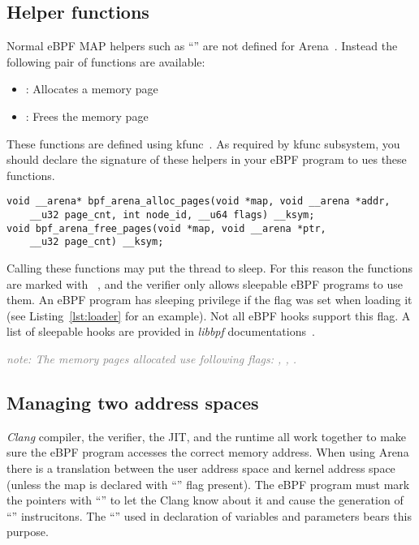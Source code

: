 \documentclass{article}
\begin{document}
\subsection{Helper functions}
Normal eBPF MAP helpers such as ``'' are not
defined for Arena~\cite{arena_source}. Instead the following pair of functions
are available:
\begin{itemize}
    \item {}: Allocates a memory page
    \item {}: Frees the memory page
\end{itemize}

These functions are defined using kfunc~\cite{eunomia_kfunc, ebpf_docs_kfunc}.
As required by kfunc subsystem, you should declare the signature of these
helpers in your eBPF program to ues these functions.
\begin{minipage}{\linewidth}
\begin{flushleft}
\begin{lstlisting}[caption={Functions operating on Arena MAP.}, label={lst:arena_kfuncs}]
void __arena* bpf_arena_alloc_pages(void *map, void __arena *addr,
    __u32 page_cnt, int node_id, __u64 flags) __ksym;
void bpf_arena_free_pages(void *map, void __arena *ptr,
    __u32 page_cnt) __ksym;
\end{lstlisting}
\end{flushleft}
\end{minipage}

Calling these functions may put the thread to sleep. For this reason the
functions are marked with ~\cite{arena_source}, and the
verifier only allows sleepable eBPF programs to use them. An eBPF program has
sleeping privilege if the  flag was set when loading it
(see Listing~\ref{lst:loader} for an example).
Not all eBPF hooks support this flag. A list of sleepable
hooks are provided in \emph{libbpf} documentations~\cite{libbpf_sleepable}.

\textcolor{gray}{\emph{note: The memory pages allocated use following flags:
, , .}}

\subsection{Managing two address spaces}

\emph{Clang} compiler, the verifier, the JIT, and the runtime all work together
to make sure the eBPF program accesses the correct memory address. When using
Arena there is a translation between the user address space and kernel address
space (unless the map is declared with ``'' flag
present). The eBPF program must mark the pointers with
``'' to let the Clang know about it and
cause the generation of ``'' instrucitons. The
``'' used in declaration of variables and parameters bears this
purpose.
\end{document}
